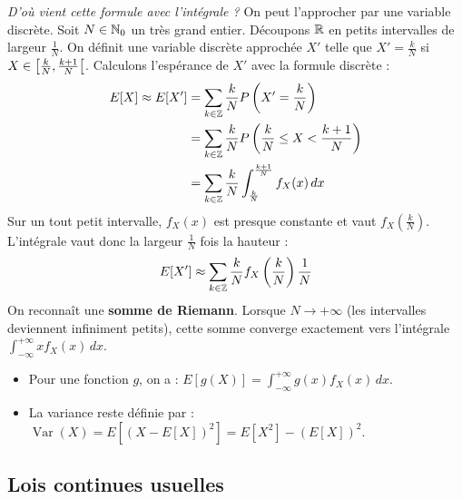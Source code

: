 \begin{exemple}
    \textit{D'où vient cette formule avec l'intégrale ?} On peut l'approcher par une variable discrète.
    Soit $N \in \mathbb{N}_0$ un très grand entier. Découpons $\mathbb{R}$ en petits intervalles de largeur $\frac{1}{N}$.
    On définit une variable discrète approchée $X'$ telle que $X' = \frac{k}{N}$ si $X \in \left[ \frac{k}{N}, \frac{k+1}{N}\right[$. 
    Calculons l'espérance de $X'$ avec la formule discrète :
    \begin{align*}
        E[X] \approx E[X'] &= \sum_{k \in \mathbb{Z}} \frac{k}{N} P\left(X' = \frac{k}{N}\right) \\
        &= \sum_{k \in \mathbb{Z}} \frac{k}{N} P\left( \frac{k}{N} \le X < \frac{k+1}{N} \right) \\
        &= \sum_{k \in \mathbb{Z}} \frac{k}{N} \int_{\frac{k}{N}}^{\frac{k+1}{N}} f_X(x) \, dx
    \end{align*}
    Sur un tout petit intervalle, $f_X(x)$ est presque constante et vaut $f_X\left(\frac{k}{N}\right)$. L'intégrale vaut donc la largeur $\frac{1}{N}$ fois la hauteur :
    \[
    E[X'] \approx \sum_{k \in \mathbb{Z}} \frac{k}{N} f_X\left(\frac{k}{N}\right) \frac{1}{N}
    \]
    On reconnaît une \textbf{somme de Riemann}. Lorsque $N \to +\infty$ (les intervalles deviennent infiniment petits), cette somme converge exactement vers l'intégrale $\int_{-\infty}^{+\infty} x f_X(x) \, dx$.
\end{exemple}

\begin{proposition}
    \begin{itemize}
        \item Pour une fonction $g$, on a : $\displaystyle E[g(X)] = \int_{-\infty}^{+\infty} g(x) f_X(x) \, dx$.
        \item La variance reste définie par : $\operatorname{Var}(X) = E[(X-E[X])^2] = E[X^2] - (E[X])^2$.
    \end{itemize}
\end{proposition}

\subsection{Lois continues usuelles}

